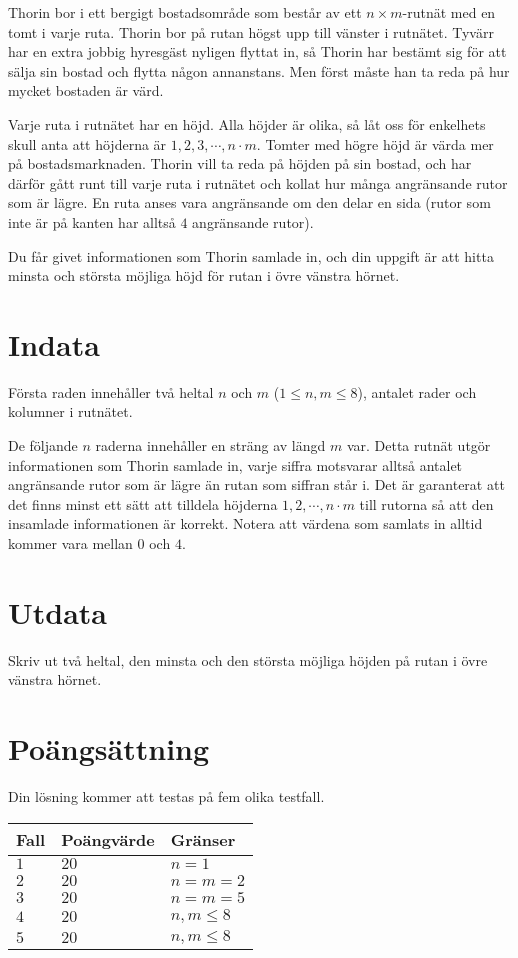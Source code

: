 

Thorin bor i ett bergigt bostadsområde som består av ett $n \times m$-rutnät med en tomt
i varje ruta. Thorin bor på rutan högst upp till vänster i rutnätet. Tyvärr har en extra 
jobbig hyresgäst nyligen flyttat in, så Thorin har bestämt sig för att
sälja sin bostad och flytta någon annanstans. Men först måste han ta reda på hur mycket bostaden
är värd.

Varje ruta i rutnätet har en höjd. Alla höjder är olika, så låt oss för enkelhets skull anta att
höjderna är $1, 2, 3, \cdots, n\cdot m$. Tomter med högre höjd är värda mer på bostadsmarknaden.
Thorin vill ta reda på höjden på sin bostad, och har därför gått runt till varje ruta i rutnätet och
kollat hur många angränsande rutor som är lägre. En ruta anses vara angränsande om den delar en sida 
(rutor som inte är på kanten har alltså $4$ angränsande rutor).

Du får givet informationen som Thorin samlade in, och din uppgift är att hitta minsta och
största möjliga höjd för rutan i övre vänstra hörnet.

\section*{Indata}
Första raden innehåller två heltal $n$ och $m$ ($1 \leq n,m \leq 8$), antalet rader och kolumner i
rutnätet.

De följande $n$ raderna innehåller en sträng av längd $m$ var. Detta rutnät utgör informationen
som Thorin samlade in, varje siffra motsvarar alltså antalet angränsande rutor som är lägre än rutan som
siffran står i. Det är garanterat att det finns minst ett sätt att tilldela höjderna 
$1, 2, \cdots, n\cdot m$ till rutorna så att den insamlade informationen är korrekt. Notera att värdena
som samlats in alltid kommer vara mellan $0$ och $4$.

\section*{Utdata}
Skriv ut två heltal, den minsta och den största möjliga höjden på rutan i övre vänstra hörnet.

\section*{Poängsättning}
Din lösning kommer att testas på fem olika testfall.

\noindent
\begin{tabular}{| l | l | l |}
  \hline
  Fall & Poängvärde & Gränser \\ \hline
  $1$    & $20$    &  $n = 1$  \\ \hline 
  $2$    & $20$    &  $n = m = 2$  \\ \hline 
  $3$    & $20$    &  $n = m = 5$  \\ \hline 
  $4$    & $20$    &  $n, m \leq 8$  \\ \hline
  $5$    & $20$    &  $n, m \leq 8$  \\ \hline
\end{tabular}